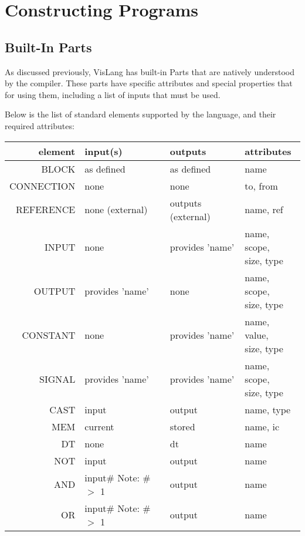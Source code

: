 \documentclass[titlepage]{article}
\makeatletter
\newcommand{\specialcell}[2][l]{%
      \begin{tabular}[#1]{@{}c@{}}#2\end{tabular}
}
\makeatother
\begin{document}
\section{Constructing Programs}
\subsection{Built-In Parts}
As discussed previously, VisLang has built-in Parts that are natively understood by the compiler.
These parts have specific attributes and special properties that for using them, including a list of inputs that must be used.
\par
Below is the list of standard elements supported by the language, and their required attributes:
\begin{longtable}[c]{ |r|l|l|l| } 
    \hline
    element & input(s) & outputs & attributes \\ 
    \hline
    \hline
    BLOCK & as defined & as defined & name \\ 
    \hline
    CONNECTION & none & none & to, from \\
    \hline
    REFERENCE & none (external) & outputs (external) & name, ref \\ 
    \hline
    \hline
    INPUT & none & provides 'name' & \specialcell{name, scope, \\ size, type} \\ 
    \hline
    OUTPUT & provides 'name' & none & \specialcell{name, scope, \\ size, type} \\ 
    \hline
    CONSTANT & none & provides 'name' & \specialcell{name, value, \\ size, type} \\ 
    \hline
    SIGNAL & provides 'name' & provides 'name' & \specialcell{name, scope, \\ size, type} \\ 
    \hline
    \hline
    CAST & input & output & name, type \\
    \hline
    MEM & current & stored & name, ic \\
    \hline
    DT & none & dt & name \\
    \hline
    NOT & input & output & name \\
    \hline
    AND & \specialcell{input\# \\ Note: \# $>$ 1} & output & name \\
    \hline
    OR & \specialcell{input\# \\ Note: \# $>$ 1} & output & name \\

\end{longtable}
\end{document}
